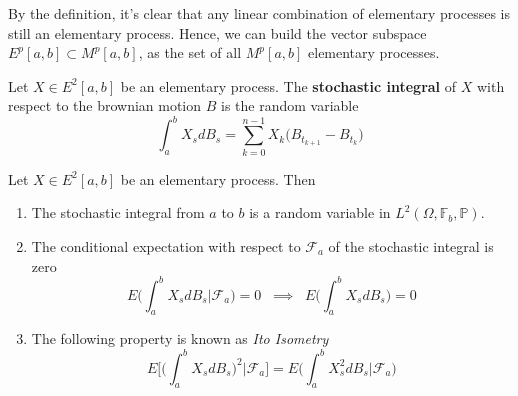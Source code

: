 By the definition, it's clear that any linear combination of elementary processes is still an elementary process. Hence, we can build the vector subspace $E^p[a,b] \subset M^p[a,b]$, as the set of all $M^p[a,b]$ elementary processes. 

\begin{definition}
    Let $X \in E^2[a,b]$ be an elementary process. The \textbf{stochastic integral} of $X$ with respect to the brownian motion $B$ is the random variable 
    \begin{equation}
        \int_a^b X_s dB_s = \sum_{k=0}^{n-1} X_k \big( B_{t_{k+1}} - B_{t_k} \big)
    \end{equation}
\end{definition}

\begin{lemma}
    Let $X \in E^2[a,b]$ be an elementary process. Then 
    \begin{enumerate}
        \item The stochastic integral from $a$ to $b$ is a random variable in $L^2(\Omega,\mathbb{F}_b,\mathbb{P})$. 
        \item The conditional expectation with respect to $\mathcal{F}_a$ of the stochastic integral is zero
        \begin{equation}
            E\Bigg( \int_a^b X_s d B_s \Big\vert \mathcal{F}_a \Bigg) = 0 \;\; \implies \;\; E\Bigg( \int_a^b X_s d B_s\Bigg) = 0 
        \end{equation}
        \item The following property is known as \textit{Ito Isometry}
        \begin{equation*}
            E\Bigg[ \Bigg(\int_a^b X_s d B_s \Bigg)^2 \big\vert \mathcal{F}_a \Bigg] = E\Bigg( \int_a^b X_s^2 d B_s \Big\vert \mathcal{F}_a \Bigg)
        \end{equation*}
    \end{enumerate}
\end{lemma}
